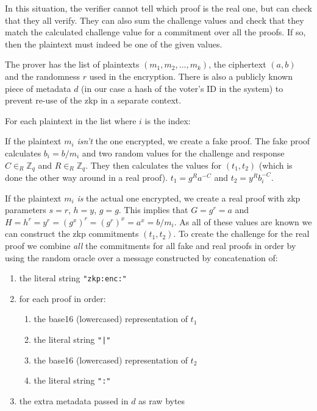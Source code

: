 In this situation, the verifier cannot tell which proof is the real one, but can check that they all verify. They can also sum the challenge values and check that they match the calculated challenge value for a commitment over all the proofs. If so, then the plaintext must indeed be one of the given values.

The prover has the list of plaintexts $(m_1, m_2, ..., m_k)$, the ciphertext $(a,b)$ and the randomness $r$ used in the encryption. There is also a publicly known piece of metadata $d$ (in our case a hash of the voter's ID in the system) to prevent re-use of the \gls{zkp} in a separate context.

For each plaintext in the list where $i$ is the index:

If the plaintext $m_i$ \emph{isn't} the one encrypted, we create a fake proof. The fake proof calculates $b_i = b / m_i$ and two random values for the challenge and response $C \in_{R} \mathbb{Z}_q$ and $R \in_{R} \mathbb{Z}_q$. They then calculates the values for $(t_1, t_2)$ (which is done the other way around in a real proof). $t_1 = g^Ra^{-C}$ and $t_2 = y^Rb_{i}^{-C}$.

If the plaintext $m_i$ \emph{is} the actual one encrypted, we create a real proof with \gls{zkp} parameters $s = r$, $h = y$, $g = g$. This implies that $G = g^r = a$ and $H = h^r = y^r = (g^x)^r = (g^r)^x = a^x = b/m_i$. As all of these values are known we can construct the \gls{zkp} commitments $(t_1, t_2)$. To create the challenge for the real proof we combine \emph{all} the commitments for all fake and real proofs in order by using the random oracle over a message constructed by concatenation of:

\begin{enumerate}
    \item the literal string \lstinline[style=ES6]{"zkp:enc:"}
    \item for each proof in order:
          \begin{enumerate}
              \item the base16 (lowercased) representation of $t_1$
              \item the literal string \lstinline[style=ES6]{"|"}
              \item the base16 (lowercased) representation of $t_2$
              \item the literal string \lstinline[style=ES6]{":"}
          \end{enumerate}
    \item the extra metadata passed in $d$ as raw bytes
\end{enumerate}

